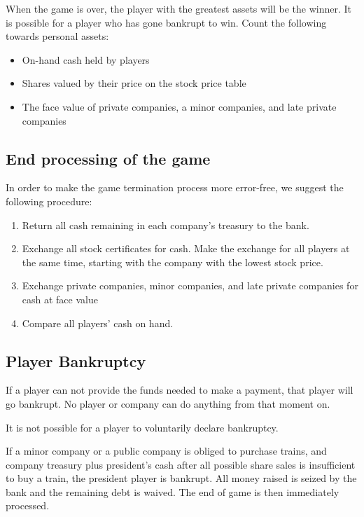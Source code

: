 \documentclass{article}
\begin{document}
\begin{CJK}{UTF8}{min}
\begin{multicols}{2}
When the game is over, the player with the greatest assets will be the
winner. It is possible for a player who has gone bankrupt to
win. Count the following towards personal assets:

\begin{itemize}
\item On-hand cash held by players
\item Shares valued by their price on the stock price table
\item The face value of private companies, a minor companies, and late
  private companies
\end{itemize}

\subsection{End processing of the game}

In order to make the game termination process more error-free, we suggest
the following procedure:

\begin{enumerate}
\item Return all cash remaining in each company's treasury to the bank.
\item Exchange all stock certificates for cash. Make the exchange for
  all players at the same time, starting with the company with the
  lowest stock price.
\item Exchange private companies, minor companies, and late private companies
  for cash at face value
\item Compare all players' cash on hand.
\end{enumerate}

\subsection{Player Bankruptcy}

If a player can not provide the funds needed to make a payment, that
player will go bankrupt. No player or company can do anything from
that moment on.

It is not possible for a player to voluntarily declare bankruptcy.

If a minor company or a public company is obliged to purchase trains,
and company treasury plus president's cash after all possible share
sales is insufficient to buy a train, the president player is
bankrupt. All money raised is seized by the bank and the remaining
debt is waived. The end of game is then immediately processed.


\end{multicols}
\end{CJK}
\end{document}
